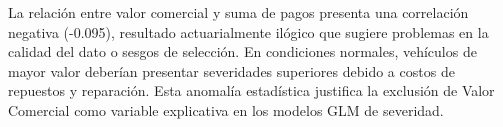 La relación entre valor comercial y suma de pagos presenta una correlación negativa (-0.095), resultado actuarialmente ilógico que sugiere problemas en la calidad del dato o sesgos de selección. En condiciones normales, vehículos de mayor valor deberían presentar severidades superiores debido a costos de repuestos y reparación. Esta anomalía estadística justifica la exclusión de Valor Comercial como variable explicativa en los modelos GLM de severidad.